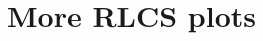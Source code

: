\documentclass[MTech]{iitmdiss}
\begin{document}
\appendix
\chapter{More RLCS plots}
\label{chap:rlcsplots_appndx}

\pagebreak
\begin{singlespace}
  \begin{small}
	
  \end{small}
\end{singlespace}
\end{document}
